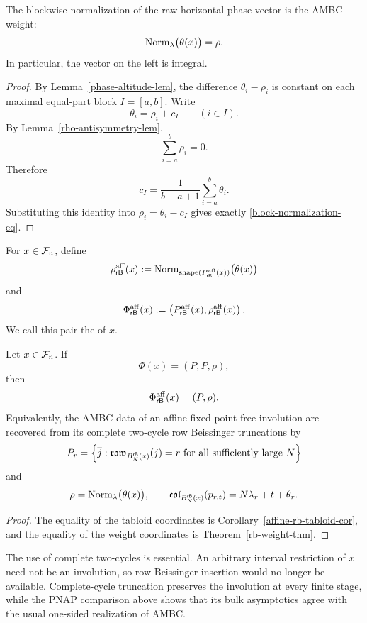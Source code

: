 \documentclass[11pt]{article}
\begin{document}
\begin{theorem}
\label{rb-weight-thm}
The blockwise normalization of the raw horizontal phase vector is the AMBC
weight:
\[
\operatorname{Norm}_{\lambda}\bigl(\theta(x)\bigr)=\rho.
\]
In particular, the vector on the left is integral.
\end{theorem}

\begin{proof}
By Lemma~\ref{phase-altitude-lem}, the difference
$\theta_i-\rho_i$ is constant on each maximal equal-part block $I=[a,b]$.
Write
\[
\theta_i=\rho_i+c_I
\qquad(i\in I).
\]
By Lemma~\ref{rho-antisymmetry-lem},
\[
\sum_{i=a}^{b}\rho_i=0.
\]
Therefore
\[
c_I
=
\frac{1}{b-a+1}\sum_{i=a}^{b}\theta_i.
\]
Substituting this identity into $\rho_i=\theta_i-c_I$ gives exactly
\eqref{block-normalization-eq}.
\end{proof}

\begin{definition}
\label{affine-rb-datum-def}
For $x\in\mathcal F_n$, define
\[
\rho^{\mathrm{aff}}_{\mathsf{rB}}(x)
:=
\operatorname{Norm}_{\operatorname{shape}(P^{\mathrm{aff}}_{\mathsf{rB}}(x))}
\bigl(\theta(x)\bigr)
\]
and
\[
\Phi^{\mathrm{aff}}_{\mathsf{rB}}(x)
:=
\left(
P^{\mathrm{aff}}_{\mathsf{rB}}(x),
\rho^{\mathrm{aff}}_{\mathsf{rB}}(x)
\right).
\]
We call this pair the  of $x$.
\end{definition}

\begin{theorem}
\label{affine-rb-main-thm}
Let $x\in\mathcal F_n$.  If
\[
\Phi(x)=(P,P,\rho),
\]
then
\[
\Phi^{\mathrm{aff}}_{\mathsf{rB}}(x)=(P,\rho).
\]
Equivalently, the AMBC data of an affine fixed-point-free involution are
recovered from its complete two-cycle row Beissinger truncations by
\[
P_r
=
\left\{
\overline{j}:\mathfrak{row}_{B^{\mathsf{rB}}_N(x)}(j)=r
\text{ for all sufficiently large }N
\right\}
\]
and
\[
\rho
=
\operatorname{Norm}_{\lambda}\bigl(\theta(x)\bigr),
\qquad
\mathfrak{col}_{B^{\mathsf{rB}}_N(x)}(p_{r,t})
=N\lambda_r+t+\theta_r.
\]
\end{theorem}

\begin{proof}
The equality of the tabloid coordinates is
Corollary~\ref{affine-rb-tabloid-cor}, and the equality of the weight
coordinates is Theorem~\ref{rb-weight-thm}.
\end{proof}

\begin{remark}
The use of complete two-cycles is essential.  An arbitrary interval
restriction of $x$ need not be an involution, so row Beissinger insertion
would no longer be available.  Complete-cycle truncation preserves the
involution at every finite stage, while the PNAP comparison above shows
that its bulk asymptotics agree with the usual one-sided realization of
AMBC.
\end{remark}
\end{document}
